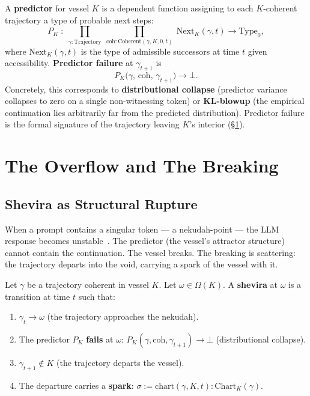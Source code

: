 \begin{definition}\label{predictor}
A \textbf{predictor} for vessel $K$ is a dependent function assigning to each $K$-coherent trajectory a type of probable next steps:
\[
P_K \;:\; \prod_{\gamma : \mathrm{Trajectory}}\; \prod_{\mathrm{coh} : \mathrm{Coherent}(\gamma, K, 0, t)}\; \mathrm{Next}_K(\gamma, t) \to \mathrm{Type}_0,
\]
where $\mathrm{Next}_K(\gamma, t)$ is the type of admissible successors at time $t$ given accessibility. \textbf{Predictor failure} at $\gamma_{t+1}$ is
\[
P_K\big(\gamma,\, \mathrm{coh},\, \gamma_{t+1}\big) \to \bot.
\]
Concretely, this corresponds to \textbf{distributional collapse} (predictor variance collapses to zero on a single non-witnessing token) or \textbf{KL-blowup} (the empirical continuation lies arbitrarily far from the predicted distribution). Predictor failure is the formal signature of the trajectory leaving $K$'s interior (§\ref{sec:shevira}).
\end{definition}

\section{The Overflow and The Breaking}
\label{sec:shevira}

\subsection{Shevira as Structural Rupture}

When a prompt contains a singular token — a nekudah-point — the LLM response becomes unstable~\cite{robinson2025token}. The predictor (the vessel's attractor structure) cannot contain the continuation. The vessel breaks. The breaking is scattering: the trajectory departs into the void, carrying a spark of the vessel with it.

\begin{definition}\label{shevira}
Let $\gamma$ be a trajectory coherent in vessel $K$. Let $\omega \in \Omega(K)$. A \textbf{shevira} at $\omega$ is a transition at time $t$ such that:
\begin{enumerate}
    \item $\gamma_t \to \omega$ (the trajectory approaches the nekudah).
    \item The predictor $P_K$ \textbf{fails} at $\omega$: $P_K(\gamma, \mathrm{coh}, \gamma_{t+1}) \to \bot$ (distributional collapse).
    \item $\gamma_{t+1} \notin K$ (the trajectory departs the vessel).
    \item The departure carries a \textbf{spark}: $\sigma := \mathrm{chart}(\gamma, K, t) : \mathrm{Chart}_K(\gamma)$.
\end{enumerate}
\end{definition}

